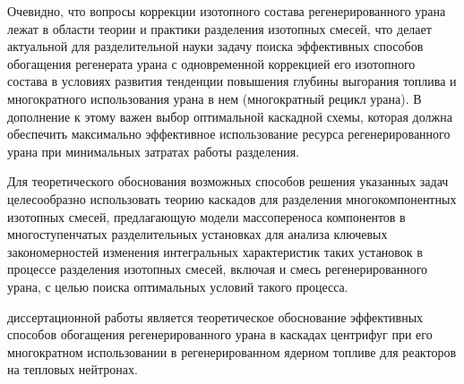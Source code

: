 Очевидно, что вопросы коррекции изотопного состава регенерированного урана лежат в области теории и практики разделения изотопных смесей, что делает актуальной для разделительной науки задачу поиска эффективных способов обогащения регенерата урана с одновременной коррекцией его изотопного состава в условиях развития тенденции повышения глубины выгорания топлива и многократного использования урана в нем (многократный рецикл урана). В дополнение к этому важен выбор оптимальной каскадной схемы, которая должна обеспечить максимально эффективное использование ресурса регенерированного урана при минимальных затратах работы разделения.

Для теоретического обоснования возможных способов решения указанных задач целесообразно использовать теорию каскадов для разделения многокомпонентных изотопных смесей, предлагающую модели массопереноса компонентов в многоступенчатых разделительных установках для анализа ключевых закономерностей изменения интегральных характеристик таких установок в процессе разделения изотопных смесей, включая и смесь регенерированного урана, с целью поиска оптимальных условий такого процесса.


{\aim} диссертационной работы является теоретическое обоснование эффективных способов обогащения регенерированного урана в каскадах центрифуг при его многократном использовании в регенерированном ядерном топливе для реакторов на тепловых нейтронах.

